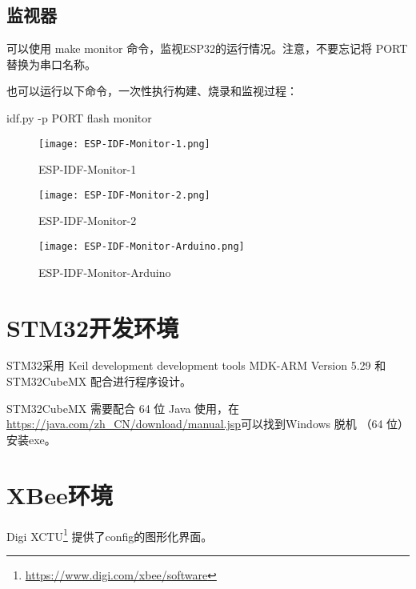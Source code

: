 \subsection{监视器}

可以使用 make monitor 命令，监视ESP32的运行情况。注意，不要忘记将 PORT 替换为串口名称。

也可以运行以下命令，一次性执行构建、烧录和监视过程：

\begin{tcolorbox}
    idf.py -p PORT flash monitor
\end{tcolorbox}

\begin{figure}[htbp]
    \centering
    \texttt{[image: ESP-IDF-Monitor-1.png]}
    \caption{ESP-IDF-Monitor-1}
    \label{fig:ESP-IDF-Monitor-1}
\end{figure}

\begin{figure}[htbp]
    \centering
    \texttt{[image: ESP-IDF-Monitor-2.png]}
    \caption{ESP-IDF-Monitor-2}
    \label{fig:ESP-IDF-Monitor-2}
\end{figure}

\begin{figure}[htbp]
    \centering
    \texttt{[image: ESP-IDF-Monitor-Arduino.png]}
    \caption{ESP-IDF-Monitor-Arduino}
    \label{fig:ESP-IDF-Monitor-Arduino}
\end{figure}


\section{STM32开发环境}

STM32采用 Keil development development tools MDK-ARM Version 5.29 和 STM32CubeMX 配合进行程序设计。

STM32CubeMX 需要配合 64 位 Java 使用，在\url{https://java.com/zh_CN/download/manual.jsp}可以找到Windows 脱机 （64 位）安装exe。

\section{XBee环境}

Digi XCTU\footnote{\url{https://www.digi.com/xbee/software}} 提供了config的图形化界面。